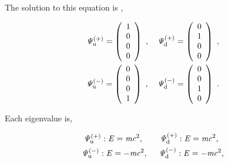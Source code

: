 \documentclass[%
 reprint,
 amsmath,amssymb,
 aps,
]{revtex4-1}
\numberwithin{equation}{section}%
\begin{document}
    The solution to this equation is \cite{Griffiths},



        \begin{align}
            \it\Psi^{(+)}_{\mathrm{u}}
            =
            \left( 
                \begin{array}{c}
                    1 \\
                    0 \\
                    0 \\
                    0 \\
                \end{array}
            \right) \
            , \ \ \
            \it\Psi^{(+)}_{\mathrm{d}}
            =
            \left( 
                \begin{array}{c}
                    0 \\
                    1 \\
                    0 \\
                    0 \\
                \end{array}
            \right) \
            \notag
            ,
            \\
            \it\Psi^{(-)}_{\mathrm{u}}
            =
            \left( 
                \begin{array}{c}
                    0 \\
                    0 \\
                    0 \\
                    1 \\
                \end{array}
            \right) \
            , \ \ \
            \it\Psi^{(-)}_{\mathrm{d}}
            =
            \left( 
                \begin{array}{c}
                    0 \\
                    0 \\
                    1 \\
                    0 \\
                \end{array}
            \right) \
            .
        \label{e_Psy_4}
        \end{align}

    Each eigenvalue is,

        \begin{align}
            \it\Psi^{(+)}_{\mathrm{u}} : E = m c \mathrm{^2}, \ \ \ \ \ \ \it\Psi^{(+)}_{\mathrm{d}} : E = m c \mathrm{^2}, \ \ %
            \notag
            \\
            \it\Psi^{(-)}_{\mathrm{u}} : E = - m c \mathrm{^2}, \ \ \ \ \it\Psi^{(-)}_{\mathrm{d}} : E = - m c \mathrm{^2},
        \label{e_Psy_5}
        \end{align}
\end{document}

